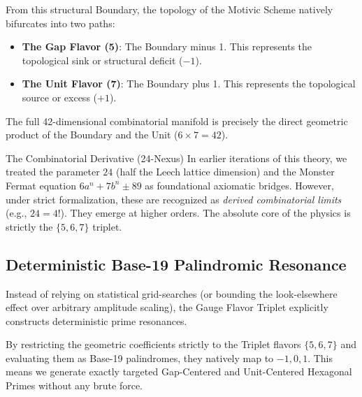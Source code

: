 From this structural Boundary, the topology of the Motivic Scheme natively bifurcates into two paths:
\begin{itemize}
    \item \textbf{The Gap Flavor (5)}: The Boundary minus 1. This represents the topological sink or structural deficit ($-1$).
    \item \textbf{The Unit Flavor (7)}: The Boundary plus 1. This represents the topological source or excess ($+1$).
\end{itemize}

The full 42-dimensional combinatorial manifold is precisely the direct geometric product of the Boundary and the Unit ($6 \times 7 = 42$).

\begin{theorembox}{The Combinatorial Derivative (24-Nexus)}
In earlier iterations of this theory, we treated the parameter $24$ (half the Leech lattice dimension) and the Monster Fermat equation $6a^n + 7b^n \pm 89$ as foundational axiomatic bridges. However, under strict formalization, these are recognized as \emph{derived combinatorial limits} (e.g., $24 = 4!$). They emerge at higher orders. The absolute core of the physics is strictly the $\{5, 6, 7\}$ triplet.
\end{theorembox}

\subsection{Deterministic Base-19 Palindromic Resonance}

Instead of relying on statistical grid-searches (or bounding the look-elsewhere effect over arbitrary amplitude scaling), the Gauge Flavor Triplet explicitly constructs deterministic prime resonances.

By restricting the geometric coefficients strictly to the Triplet flavors $\{5, 6, 7\}$ and evaluating them as Base-19 palindromes, they natively map to $-1, 0, 1$. This means we generate exactly targeted Gap-Centered and Unit-Centered Hexagonal Primes without any brute force.

